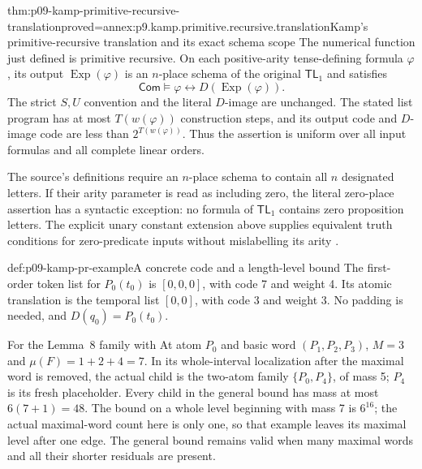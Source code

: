 \begin{hbtheorem}{thm:p09-kamp-primitive-recursive-translation}{proved=annex:p9.kamp.primitive.recursive.translation}{Kamp's primitive-recursive translation and its exact schema scope}
The numerical function just defined is primitive recursive. On each
positive-arity tense-defining formula \(\varphi\), its output
\(\operatorname{Exp}(\varphi)\) is an \(n\)-place schema of
the original \(\mathsf{TL}_1\) and satisfies
\[
 \mathsf{Com}\models
       \varphi\longleftrightarrow D(\operatorname{Exp}(\varphi)).
\]
The strict \(S,U\) convention and the literal \(D\)-image are
unchanged. The stated list program has at most \(T(w(\varphi))\)
construction steps, and its output code and \(D\)-image code are
less than \(2^{T(w(\varphi))}\). Thus the assertion is uniform
over all input formulas and all complete linear orders.

The source's definitions require an \(n\)-place schema to contain
all \(n\) designated letters. If their arity parameter is read as
including zero, the literal zero-place assertion has a syntactic
exception: no formula of \(\mathsf{TL}_1\) contains zero proposition
letters. The explicit unary constant extension above supplies equivalent
truth conditions for zero-predicate inputs without mislabelling its arity
\cite[ch.~II, defs.~2,4 and thm.~2, pp.~21--23,28]{Kamp1968}.
\end{hbtheorem}

\begin{hbexample}{def:p09-kamp-pr-example}{A concrete code and a length-level bound}
The first-order token list for \(P_0(t_0)\) is \([0,0,0]\),
with code 7 and weight 4. Its atomic translation is the temporal
list \([0,0]\), with code 3 and weight 3. No padding is
needed, and \(D(q_0)=P_0(t_0)\).

For the Lemma~8 family with At atom \(P_0\) and basic word
\((P_1,P_2,P_3)\), \(M=3\) and \(\mu(F)=1+2+4=7\).
In its whole-interval localization after the maximal word is removed,
the actual child is the two-atom family \(\{P_0,P_4\}\), of mass 5;
\(P_4\) is its fresh placeholder. Every child in the general bound
has mass at most \(6(7+1)=48\). The bound on a
whole level beginning with mass 7 is \(6^{16}\); the actual
maximal-word count here is only one, so that example leaves its
maximal level after one edge. The general bound remains valid when
many maximal words and all their shorter residuals are present.
\end{hbexample}
